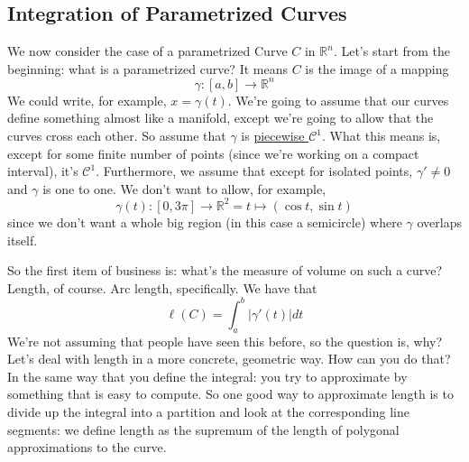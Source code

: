 \documentclass{article}
\newcommand{\reals}[0]{\mathbb{R}}
\newcommand{\mc}[1]{\mathcal{#1}}
\begin{document}
\subsection{Integration of Parametrized Curves}

We now consider the case of a parametrized Curve \(C\) in \(\reals^n\). Let's start from the beginning: what is a parametrized curve? It means \(C\) is the image of a mapping
\begin{equation}
  \gamma : [a, b] \to \reals^n
\end{equation}
We could write, for example, \(x = \gamma(t)\). We're going to assume that our curves define something almost like a manifold, except we're going to allow that the curves cross each other. So assume that \(\gamma\) is \underline{piecewise \(\mc{C}^1\)}. What this means is, except for some finite number of points (since we're working on a compact interval), it's \(\mc{C}^1\). Furthermore, we assume that except for isolated points, \(\gamma' \neq 0\) and \(\gamma\) is one to one.
We don't want to allow, for example,
\begin{equation}
  \gamma(t): [0, 3\pi] \to \reals^2 = t \mapsto (\cos t, \sin t)
\end{equation}
since we don't want a whole big region (in this case a semicircle) where \(\gamma\) overlaps itself.

So the first item of business is: what's the measure of volume on such a curve? Length, of course. Arc length, specifically. We have that
\begin{equation}
  \ell(C) = \int_a^b|\gamma'(t)|dt
\end{equation}
We're not assuming that people have seen this before, so the question is, why? Let's deal with length in a more concrete, geometric way. How can you do that? In the same way that you define the integral: you try to approximate by something that is easy to compute. So one good way to approximate length is to divide up the integral into a partition and look at the corresponding line segments: we define length as the supremum of the length of polygonal approximations to the curve.
\end{document}
